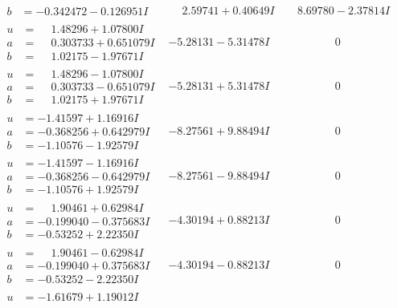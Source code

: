\documentclass[1p]{elsarticle_modified}
\theoremstyle{definition}
\begin{document}
$$\begin{array}{c|c|c}
\begin{aligned}
b &= -0.342472 - 0.126951 I\end{aligned}
 & \phantom{-}2.59741 + 0.40649 I & \phantom{-}8.69780 - 2.37814 I \\ \hline\begin{aligned}
u &= \phantom{-}1.48296 + 1.07800 I \\
a &= \phantom{-}0.303733 + 0.651079 I \\
b &= \phantom{-}1.02175 - 1.97671 I\end{aligned}
 & -5.28131 - 5.31478 I & \phantom{-0.000000 } 0 \\ \hline\begin{aligned}
u &= \phantom{-}1.48296 - 1.07800 I \\
a &= \phantom{-}0.303733 - 0.651079 I \\
b &= \phantom{-}1.02175 + 1.97671 I\end{aligned}
 & -5.28131 + 5.31478 I & \phantom{-0.000000 } 0 \\ \hline\begin{aligned}
u &= -1.41597 + 1.16916 I \\
a &= -0.368256 + 0.642979 I \\
b &= -1.10576 - 1.92579 I\end{aligned}
 & -8.27561 + 9.88494 I & \phantom{-0.000000 } 0 \\ \hline\begin{aligned}
u &= -1.41597 - 1.16916 I \\
a &= -0.368256 - 0.642979 I \\
b &= -1.10576 + 1.92579 I\end{aligned}
 & -8.27561 - 9.88494 I & \phantom{-0.000000 } 0 \\ \hline\begin{aligned}
u &= \phantom{-}1.90461 + 0.62984 I \\
a &= -0.199040 - 0.375683 I \\
b &= -0.53252 + 2.22350 I\end{aligned}
 & -4.30194 + 0.88213 I & \phantom{-0.000000 } 0 \\ \hline\begin{aligned}
u &= \phantom{-}1.90461 - 0.62984 I \\
a &= -0.199040 + 0.375683 I \\
b &= -0.53252 - 2.22350 I\end{aligned}
 & -4.30194 - 0.88213 I & \phantom{-0.000000 } 0 \\ \hline\begin{aligned}
u &= -1.61679 + 1.19012 I \\

\end{aligned}
\end{array}$$
\end{document}
